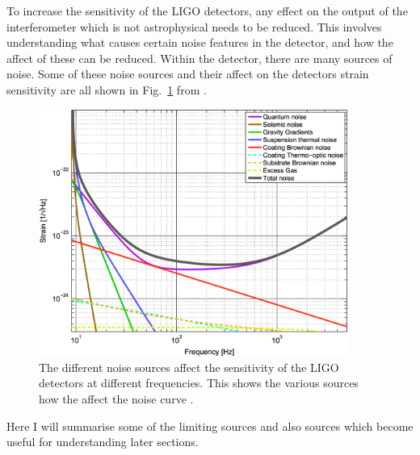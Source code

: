 To increase the sensitivity of the \ac{LIGO} detectors, any effect on the output of the interferometer which is not astrophysical needs to be reduced.
This involves understanding what causes certain noise features in the detector, and how the affect of these can be reduced. 
Within the detector, there are many sources of noise.
Some of these noise sources and their affect on the detectors strain sensitivity are all shown in Fig.~\ref{detectors:noisesensitivity} from \citep{aasi2015AdvancedLIGO}.
\begin{figure}[h]
    \centering
    \includegraphics[width=0.9\textwidth]{C1_intro/noise_sensitivity.jpg}
    \caption{The different noise sources affect the sensitivity of the \ac{LIGO} detectors at different frequencies. This shows the various sources how the affect the noise curve \citep{aasi2015AdvancedLIGO}.}
    \label{detectors:noisesensitivity}
\end{figure}
Here I will summarise some of the limiting sources and also sources which become useful for understanding later sections.

